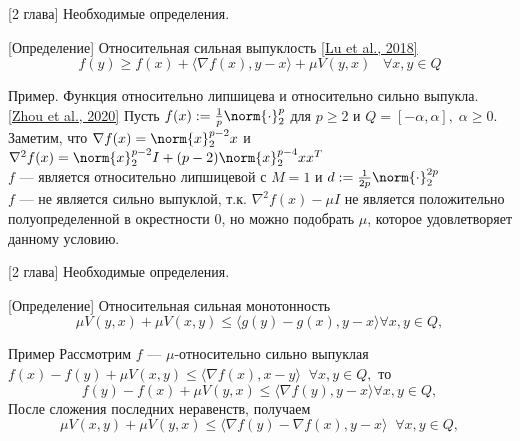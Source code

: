 \begin{frame}{[2 глава] Необходимые определения.}
    \begin{block}{[Определение] Относительная сильная выпуклость \href{https://arxiv.org/pdf/1610.05708.pdf}{[Lu et al., 2018]}}
        $$
         f(y) \geq f(x) + \langle \nabla f(x), y - x \rangle + \mu V(y, x) \;\;\; \forall x, y \in Q
        $$
    \end{block}
    \begin{exampleblock}{Пример. Функция относительно липшицева и относительно сильно выпукла. \href{https://proceedings.neurips.cc/paper/2020/file/b67fb3360ae5597d85a005153451dd4e-Paper.pdf}{[Zhou et al., 2020]}} 
        Пусть $f(x) := \frac{1}{p}\norm{\cdot}^p_2$ для $p \geq 2$ и $ Q = [-\alpha, \alpha], \; \alpha \ge 0$. Заметим, что $\nabla f(x) = \norm{x}_2^{p - 2} x$ и $\nabla^2 f(x) = \norm{x}_2^{p - 2} I + (p-2)\norm{x}_2^{p - 4} x x^{T}$\\
        $f$ --- является относительно липшицевой с $M = 1$ и $d := \frac{1}{2p}\norm{\cdot}_2^{2p}$\\
        $f$ --- не является сильно выпуклой, т.к. $\nabla^2 f(x) - \mu I$ не является положительно полуопределенной в окрестности 0, но можно подобрать $\mu$, которое удовлетворяет данному условию.
    \end{exampleblock}
\end{frame}


\begin{frame}{[2 глава] Необходимые определения.}
    \begin{block}{[Определение] Относительная сильная монотонность}
        $$ \mu V(y, x) + \mu V(x, y) \leq \langle g(y) - g(x), y - x \rangle  \forall x, y \in Q,$$
    \end{block}
    \begin{exampleblock}{Пример}
        Рассмотрим $f$ --- $\mu$-относительно сильно выпуклая \\$f(x) - f(y) + \mu V(x, y) \leq \langle \nabla{f(x)}, x - y \rangle  \;\; \forall x, y \in Q, $
        то
        $$f(y) - f(x) + \mu V(y, x) \leq \langle \nabla{f(y)}, y - x \rangle  \forall x, y \in Q, $$
        После сложения последних неравенств, получаем
        $$\mu V(x, y) + \mu V(y, x)\leq \langle \nabla{f(y)} - \nabla{f(x)}, y - x \rangle \;\; \forall x, y \in Q,$$
    \end{exampleblock}
\end{frame}


